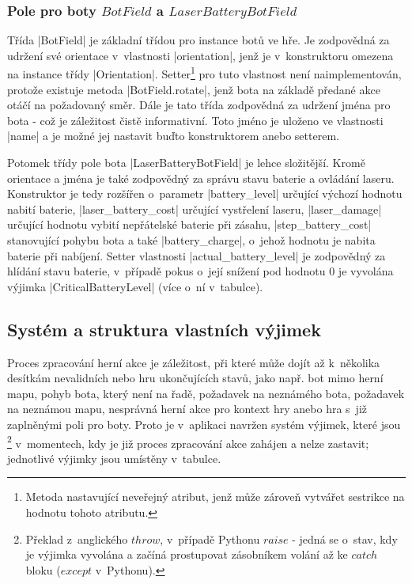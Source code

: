 \subsubsection{Pole pro boty $BotField$ a $LaserBatteryBotField$}

Třída \ic|BotField| je základní třídou pro instance botů ve hře. Je zodpovědná za udržení své orientace v~vlastnosti \ic|orientation|, jenž je v~konstruktoru omezena na instance třídy \ic|Orientation|. Setter\footnote{Metoda nastavující neveřejný atribut, jenž může zároveň vytvářet sestrikce na hodnotu tohoto atributu.} pro tuto vlastnost není naimplementován, protože existuje metoda \ic|BotField.rotate|, jenž bota na základě předané akce otáčí na požadovaný směr. Dále je tato třída zodpovědná za udržení jména pro bota - což je záležitost čistě informativní. Toto jméno je uloženo ve vlastnosti \ic|name| a je možné jej nastavit buďto konstruktorem anebo setterem.

\begin{sloppypar}
    Potomek třídy pole bota \ic|LaserBatteryBotField| je lehce složitější. Kromě orientace a jména je také zodpovědný za správu stavu baterie a ovládání laseru. Konstruktor je tedy rozšířen o~parametr \ic|battery_level| určující výchozí hodnotu nabití baterie, \ic|laser_battery_cost| určující  vystřelení laseru, \ic|laser_damage| určující hodnotu vybití nepřátelské baterie při zásahu, \ic|step_battery_cost| stanovující  pohybu bota a také \ic|battery_charge|, o~jehož hodnotu je nabita baterie při nabíjení. Setter vlastnosti \ic|actual_battery_level| je zodpovědný za hlídání stavu baterie, v~případě pokus o~její snížení pod hodnotu $0$ je vyvolána výjimka \ic|CriticalBatteryLevel| (více o~ní v~tabulce).
\end{sloppypar}

\subsection{Systém a struktura vlastních výjimek}
\label{subsec:custom-exceptions}

Proces zpracování herní akce je záležitost, při které může dojít až k~několika desítkám nevalidních nebo hru ukončujících stavů, jako např. bot mimo herní mapu, pohyb bota, který není na řadě, požadavek na neznámého bota, požadavek na neznámou mapu, nesprávná herní akce pro kontext hry anebo hra s~již zaplněnými poli pro boty. Proto je v~aplikaci navržen systém výjimek, které jsou \footnote{Překlad z~anglického $throw$, v~případě Pythonu $raise$ - jedná se o~stav, kdy je výjimka vyvolána a začíná prostupovat zásobníkem volání až ke $catch$ bloku ($except$ v~Pythonu).} v~momentech, kdy je již proces zpracování akce zahájen a nelze zastavit; jednotlivé výjimky jsou umístěny v~tabulce.

